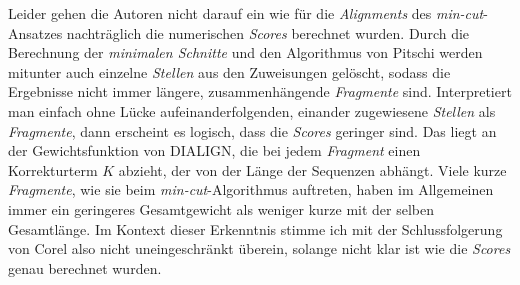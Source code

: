 Leider gehen die Autoren nicht darauf ein wie für die \emph{Alignments} des \emph{min-cut}-Ansatzes nachträglich die numerischen \emph{Scores} berechnet wurden. Durch die Berechnung der \emph{minimalen Schnitte} und den Algorithmus von Pitschi werden mitunter auch einzelne \emph{Stellen} aus den Zuweisungen gelöscht, sodass die Ergebnisse nicht immer längere, zusammenhängende \emph{Fragmente} sind. Interpretiert man einfach ohne Lücke aufeinanderfolgenden, einander zugewiesene \emph{Stellen} als \emph{Fragmente}, dann erscheint es logisch, dass die \emph{Scores} geringer sind. Das liegt an der Gewichtsfunktion von DIALIGN, die bei jedem \emph{Fragment} einen Korrekturterm $K$ abzieht, der von der Länge der Sequenzen abhängt. Viele kurze \emph{Fragmente}, wie sie beim \emph{min-cut}-Algorithmus auftreten, haben im Allgemeinen immer ein geringeres Gesamtgewicht als weniger kurze mit der selben Gesamtlänge. Im Kontext dieser Erkenntnis stimme ich mit der Schlussfolgerung von Corel also nicht uneingeschränkt überein, solange nicht klar ist wie die \emph{Scores} genau berechnet wurden.
